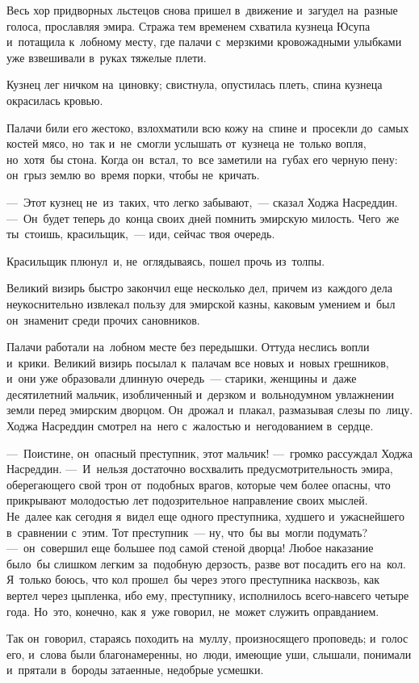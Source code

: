 \documentclass[12pt,a4paper]{book}
\begin{document}
Весь хор придворных льстецов снова пришел в~движение и~загудел на~разные голоса, прославляя эмира. Стража тем временем схватила кузнеца Юсупа и~потащила к~лобному месту, где палачи с~мерзкими кровожадными улыбками уже взвешивали в~руках тяжелые плети.

Кузнец лег ничком на~циновку; свистнула, опустилась плеть, спина кузнеца окрасилась кровью.

Палачи били его жестоко, взлохматили всю кожу на~спине и~просекли до~самых костей мясо, но~так и~не~смогли услышать от~кузнеца не~только вопля, но~хотя~бы стона. Когда он~встал, то~все заметили на~губах его черную пену: он~грыз землю во~время порки, чтобы не~кричать.

—~Этот кузнец не~из~таких, что легко забывают,~— сказал Ходжа Насреддин. —~Он~будет теперь до~конца своих дней помнить эмирскую милость. Чего~же ты~стоишь, красильщик,~— иди, сейчас твоя очередь.

Красильщик плюнул~и, не~оглядываясь, пошел прочь из~толпы.

Великий визирь быстро закончил еще несколько дел, причем из~каждого дела неукоснительно извлекал пользу для эмирской казны, каковым умением и~был он~знаменит среди прочих сановников.

Палачи работали на~лобном месте без передышки. Оттуда неслись вопли и~крики. Великий визирь посылал к~палачам все новых и~новых грешников, и~они уже образовали длинную очередь~— старики, женщины и~даже десятилетний мальчик, изобличенный и~дерзком и~вольнодумном увлажнении земли перед эмирским дворцом. Он~дрожал и~плакал, размазывая слезы по~лицу. Ходжа Насреддин смотрел на~него с~жалостью и~негодованием в~сердце.

—~Поистине, он~опасный преступник, этот мальчик! —~громко рассуждал Ходжа Насреддин. —~И~нельзя достаточно восхвалить предусмотрительность эмира, оберегающего свой трон от~подобных врагов, которые чем более опасны, что прикрывают молодостью лет подозрительное направление своих мыслей. Не~далее как сегодня я~видел еще одного преступника, худшего и~ужаснейшего в~сравнении с~этим. Тот преступник~— ну, что~бы вы~могли подумать? —~он~совершил еще большее под самой стеной дворца! Любое наказание было~бы слишком легким за~подобную дерзость, разве вот посадить его на~кол. Я~только боюсь, что кол прошел~бы через этого преступника насквозь, как вертел через цыпленка, ибо ему, преступнику, исполнилось всего-навсего четыре года. Но~это, конечно, как я~уже говорил, не~может служить оправданием.

Так он~говорил, стараясь походить на~муллу, произносящего проповедь; и~голос его, и~слова были благонамеренны, но~люди, имеющие уши, слышали, понимали и~прятали в~бороды затаенные, недобрые усмешки.
\end{document}
